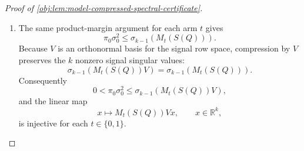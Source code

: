\begin{proof}[Proof of \cref{obj:lem:model-compressed-spectral-certificate}]
\begin{enumerate}
Also,
\[
M_t(S(Q))^\top
=
B\Xi_t^\top
=
V\Upsilon\Xi_t^\top ,
\]
so the row space of each \(M_t(S(Q))\) is contained in \(\operatorname{range}(V)\).  For \(t=0\), latent-arm positivity in \cref{obj:ass:latent-arm-positivity} gives
\[
\Gamma_0(u,u)=\frac{Q(U=u,T=0)}{Q(T=0)}\ge \pi_0
\]
for every \(u\), since \(Q(U=u,T=0)\ge\pi_0\) and \(Q(T=0)\le1\).  Combining this with \cref{obj:ass:proxy-rank-margin} and the standard product lower bound for the least signal singular value,
\[
\begin{aligned}
\sigma_{k-1}\!\left(M_0(S(Q))\right)
&=
\sigma_{k-1}\!\left(A_0\Gamma_0B^\top\right)  \\
&\ge
\sigma_{k-1}(A_0)\,\sigma_{k-1}(\Gamma_0)\,\sigma_{k-1}(B)
\ge
\pi_0\sigma_0^2 .
\end{aligned}
\]
Thus \(M_0(S(Q))\) has row rank \(k\).  Its row space is contained in the \(k\)-dimensional space \(\operatorname{range}(V)\), hence
\[
\operatorname{range}\!\left(M_0(S(Q))^\top\right)=\operatorname{range}(V).
\]
Since the row space of \(M_1(S(Q))\) is contained in the same space, the signal row space of \(S(Q)\) equals
\[
\operatorname{range}\!\left(M_0(S(Q))^\top\right)
+
\operatorname{range}\!\left(M_1(S(Q))^\top\right)
=
\operatorname{range}(V).
\]
Thus \(V\) spans the signal row space of \(S(Q)\).

\item
The same product-margin argument for each arm \(t\) gives
\[
\pi_0\sigma_0^2
\le
\sigma_{k-1}\!\left(M_t(S(Q))\right).
\]
Because \(V\) is an orthonormal basis for the signal row space, compression by \(V\) preserves the \(k\) nonzero signal singular values:
\[
\sigma_{k-1}\!\left(M_t(S(Q))V\right)
=
\sigma_{k-1}\!\left(M_t(S(Q))\right).
\]
Consequently
\[
0<\pi_0\sigma_0^2
\le
\sigma_{k-1}\!\left(M_t(S(Q))V\right),
\]
and the linear map
\[
x\longmapsto M_t(S(Q))Vx,\qquad x\in\mathbb R^k,
\]
is injective for each \(t\in\{0,1\}\).


\end{enumerate}
\end{proof}
